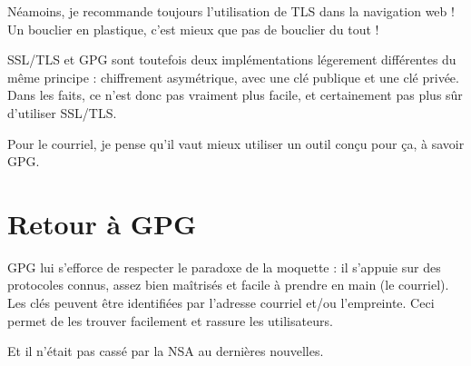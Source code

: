 \begin{notice}
	Néamoins, je recommande toujours l'utilisation de TLS dans la navigation web ! Un bouclier en plastique, c'est mieux que pas de bouclier du tout !
\end{notice}

SSL/TLS et GPG sont toutefois deux implémentations légerement différentes du même principe : chiffrement asymétrique, avec une clé
publique et une clé privée. Dans les faits, ce n'est donc pas vraiment plus facile, et certainement pas plus sûr d'utiliser SSL/TLS.

Pour le courriel, je pense qu'il vaut mieux utiliser un outil conçu pour ça, à savoir GPG.

\section{Retour à GPG}\label{retour-uxe0-gpg}

GPG lui s'efforce de respecter le paradoxe de la moquette : il s'appuie sur des protocoles connus, assez bien maîtrisés et facile à prendre en
main (le courriel).\\Les clés peuvent être identifiées par l'adresse
courriel et/ou l'empreinte. Ceci permet de les trouver facilement et rassure les utilisateurs.

Et il n'était pas cassé par la NSA au dernières nouvelles.